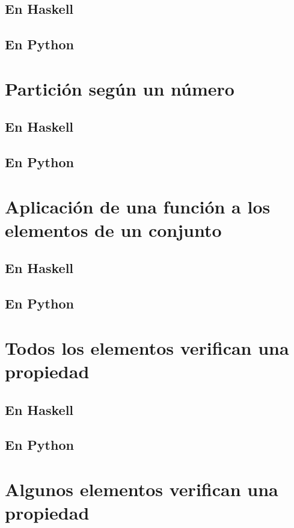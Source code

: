 \documentclass[a4paper,12pt,twoside]{book}
\begin{document}
\subsection{En Haskell}
\subsection{En Python}

\section{Partición según un número}
\subsection{En Haskell}
\subsection{En Python}

\section{Aplicación de una función a los elementos de un conjunto}
\subsection{En Haskell}
\subsection{En Python}

\section{Todos los elementos verifican una propiedad}
\subsection{En Haskell}
\subsection{En Python}

\section{Algunos elementos verifican una propiedad}
\end{document}
